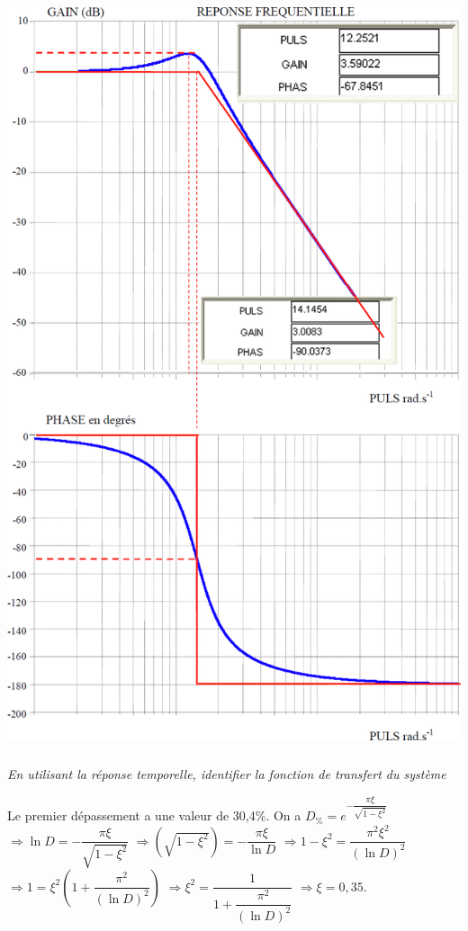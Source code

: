 \documentclass[10pt,fleqn]{article} %
\begin{document}
\begin{multicols}{2}
\begin{center}
\includegraphics[width=\linewidth]{images/fig_03}
\end{center}



\subparagraph{}\textit{En utilisant la réponse temporelle, identifier la fonction de transfert du système}
\ifprof
\begin{corrige}
Le premier dépassement a une valeur de 30,4\%. On a
$D_\%=e^{-\dfrac{\pi \xi}{\sqrt{1-\xi^2}}}$
$\Rightarrow \ln D = -\dfrac{\pi \xi}{\sqrt{1-\xi^2}}$
$\Rightarrow \left( \sqrt{1-\xi^2} \right)  = -\dfrac{\pi \xi}{\ln D}$
$\Rightarrow 1-\xi^2= \dfrac{\pi^2 \xi^2}{\left(\ln D\right)^2}$
$\Rightarrow 1= \xi^2\left( 1+\dfrac{\pi^2 }{\left(\ln D\right)^2}\right)$
$\Rightarrow \xi^2= \dfrac{1}{ 1+\dfrac{\pi^2 }{\left(\ln D\right)^2}}$
$\Rightarrow \xi=0,35$.


\end{corrige}
\end{multicols}
\end{document}
